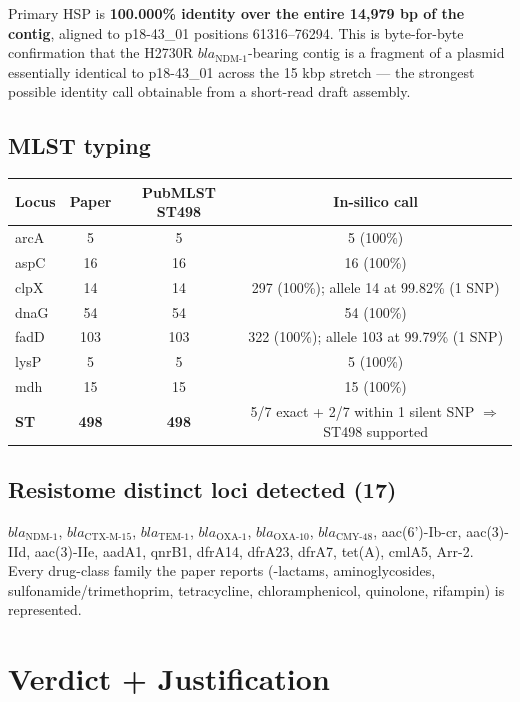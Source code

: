 \documentclass[11pt]{article}
\begin{document}
Primary HSP is \textbf{100.000\% identity over the entire 14{,}979 bp of the contig}, aligned to
p18-43\_01 positions 61316--76294. This is byte-for-byte confirmation that the H2730R
$bla_{\text{NDM-1}}$-bearing contig is a fragment of a plasmid essentially identical to p18-43\_01
across the 15 kbp stretch --- the strongest possible identity call obtainable from a short-read
draft assembly.

\subsection{MLST typing}

\begin{center}
\begin{tabular}{@{}lccc@{}}
\toprule
Locus & Paper & PubMLST ST498 & In-silico call \\
\midrule
arcA  & 5   & 5   & 5 (100\%) \\
aspC  & 16  & 16  & 16 (100\%) \\
clpX  & 14  & 14  & 297 (100\%); allele 14 at 99.82\% (1 SNP) \\
dnaG  & 54  & 54  & 54 (100\%) \\
fadD  & 103 & 103 & 322 (100\%); allele 103 at 99.79\% (1 SNP) \\
lysP  & 5   & 5   & 5 (100\%) \\
mdh   & 15  & 15  & 15 (100\%) \\
\midrule
\textbf{ST} & \textbf{498} & \textbf{498} & 5/7 exact + 2/7 within 1 silent SNP $\Rightarrow$ ST498 supported \\
\bottomrule
\end{tabular}
\end{center}

\subsection{Resistome distinct loci detected (17)}

$bla_{\text{NDM-1}}$, $bla_{\text{CTX-M-15}}$, $bla_{\text{TEM-1}}$, $bla_{\text{OXA-1}}$,
$bla_{\text{OXA-10}}$, $bla_{\text{CMY-48}}$, aac(6')-Ib-cr, aac(3)-IId, aac(3)-IIe, aadA1,
qnrB1, dfrA14, dfrA23, dfrA7, tet(A), cmlA5, Arr-2. Every drug-class family the paper reports
(\textbeta-lactams, aminoglycosides, sulfonamide/trimethoprim, tetracycline, chloramphenicol,
quinolone, rifampin) is represented.

\section{Verdict + Justification}
\end{document}
